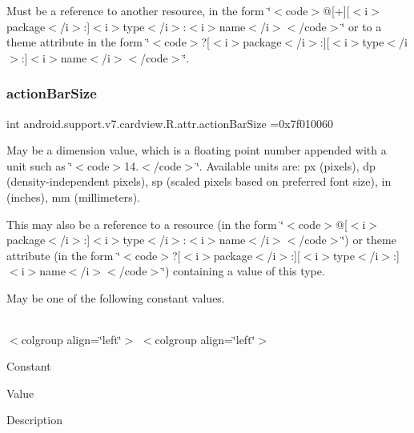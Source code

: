 Must be a reference to another resource, in the form \char`\"{}$<$code$>$@\mbox{[}+\mbox{]}\mbox{[}$<$i$>$package$<$/i$>$\+:\mbox{]}$<$i$>$type$<$/i$>$\+:$<$i$>$name$<$/i$>$$<$/code$>$\char`\"{} or to a theme attribute in the form \char`\"{}$<$code$>$?\mbox{[}$<$i$>$package$<$/i$>$\+:\mbox{]}\mbox{[}$<$i$>$type$<$/i$>$\+:\mbox{]}$<$i$>$name$<$/i$>$$<$/code$>$\char`\"{}. \mbox{\label{classandroid_1_1support_1_1v7_1_1cardview_1_1R_1_1attr_ac3e9990e1d340ee3e2e2fa35174e2f4b}} 
\subsubsection{\texorpdfstring{action\+Bar\+Size}{actionBarSize}}
{\footnotesize\ttfamily int android.\+support.\+v7.\+cardview.\+R.\+attr.\+action\+Bar\+Size =0x7f010060\hspace{0.3cm}{\ttfamily [static]}}

May be a dimension value, which is a floating point number appended with a unit such as \char`\"{}$<$code$>$14.\+5sp$<$/code$>$\char`\"{}. Available units are\+: px (pixels), dp (density-\/independent pixels), sp (scaled pixels based on preferred font size), in (inches), mm (millimeters). 

This may also be a reference to a resource (in the form \char`\"{}$<$code$>$@\mbox{[}$<$i$>$package$<$/i$>$\+:\mbox{]}$<$i$>$type$<$/i$>$\+:$<$i$>$name$<$/i$>$$<$/code$>$\char`\"{}) or theme attribute (in the form \char`\"{}$<$code$>$?\mbox{[}$<$i$>$package$<$/i$>$\+:\mbox{]}\mbox{[}$<$i$>$type$<$/i$>$\+:\mbox{]}$<$i$>$name$<$/i$>$$<$/code$>$\char`\"{}) containing a value of this type. 

May be one of the following constant values.

\tabulinesep=1mm
\begin{longtabu} spread 0pt [c]{*{0}{|X[-1]}|}
\hline
\end{longtabu}
$<$colgroup align=\char`\"{}left\char`\"{}$>$ $<$colgroup align=\char`\"{}left\char`\"{}$>$ 

Constant

Value

Description 

